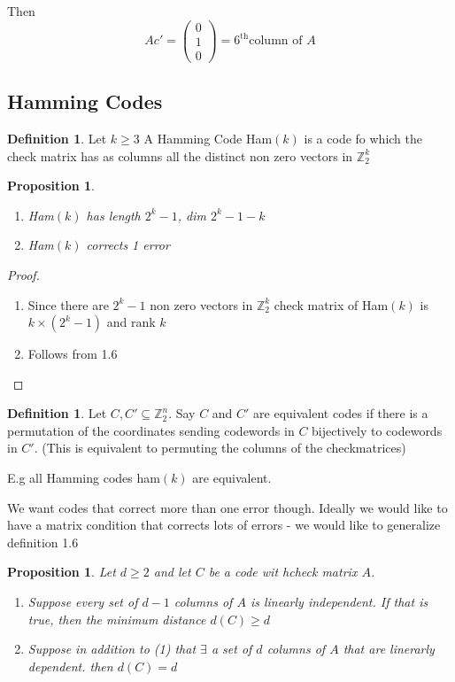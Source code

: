 \documentclass[amsfonts]{amsart}
\newtheorem{prop}[thm]{Proposition}
\theoremstyle{definition}
\newtheorem{defn}[thm]{Definition}
\theoremstyle{remark}
\numberwithin{equation}{section}
\begin{document}
Then \[
	Ac' = \begin{pmatrix}0\\1\\0\end{pmatrix} = 6^\text{th} \text{column of }A
\]

\subsection{Hamming Codes}

\begin{defn}
Let $k\geq3$ A Hamming Code Ham$(k)$ is a code fo which the check matrix has as columns all the distinct non zero vectors in $\mathbb{Z}_2^k$
\end{defn}


\begin{prop}
\begin{enumerate}
	\item Ham$(k)$ has length $2^k-1$, dim $2^k-1 - k$
	\item Ham$(k)$ corrects 1 error
\end{enumerate}
\end{prop}
\begin{proof}
	\par
	\begin{enumerate}
	\item\par
		Since there are $2^k-1$ non zero vectors in $\mathbb{Z}_2^k$ check matrix of Ham$(k)$ is $k\times (2^k-1)$ and rank $k$
	\item\par
		Follows from 1.6 
	\end{enumerate}
\end{proof}

\begin{defn}
Let $C, C' \subseteq \mathbb{Z}_2^n$. Say $C$ and $C'$ are equivalent codes if there is a permutation of the coordinates sending codewords in $C$ bijectively to codewords in $C'$. (This is equivalent to permuting the columns of the checkmatrices)
\end{defn}

E.g all Hamming codes ham$(k)$ are equivalent.

We want codes that correct more than one error though. Ideally we would like to have a matrix condition that corrects lots of errors - we would like to generalize definition 1.6

\begin{prop}
Let $d \geq 2$ and let $C$ be a code wit hcheck matrix $A$. 
\begin{enumerate}
	\item\par Suppose every set of $d-1$ columns of $A$ is linearly independent. If that is true, then the minimum distance $d(C) \geq d$
	\item\par Suppose in addition to (1) that $\exists$ a set of $d$ columns of $A$ that are linerarly dependent. then $d(C) = d$
\end{enumerate}
\end{prop}
\end{document}
